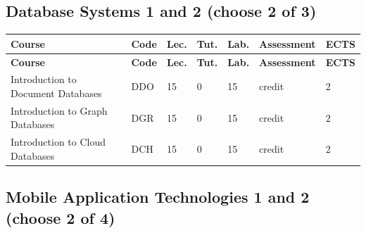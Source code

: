 \documentclass[12pt,a4paper]{article}
\newcommand{\thdrule}{\noalign{\global\setlength{\extrarowheight}{0pt}}}
\newcommand{\thdend}{\noalign{\global\setlength{\extrarowheight}{4pt}}}
\begin{document}
\subsection*{Database Systems 1 and 2 (choose 2 of 3)}

{\scriptsize
\begin{longtable}{m{5.5cm}m{0.8cm}m{1cm}m{1cm}m{1cm}m{1.7cm}m{0.7cm}}
\thdrule\toprule
\rowcolor{pjatkRed}
{\color{white}\footnotesize\textbf{\vphantom{Ag}Course}} & {\color{white}\footnotesize\textbf{\vphantom{Ag}Code}} & {\color{white}\footnotesize\textbf{\vphantom{Ag}Lec.}} & {\color{white}\footnotesize\textbf{\vphantom{Ag}Tut.}} & {\color{white}\footnotesize\textbf{\vphantom{Ag}Lab.}} & {\color{white}\footnotesize\textbf{\vphantom{Ag}Assessment}} & {\color{white}\footnotesize\textbf{\vphantom{Ag}ECTS}} \\
\midrule\thdend
\endfirsthead
\thdrule\toprule
\rowcolor{pjatkRed}
{\color{white}\footnotesize\textbf{\vphantom{Ag}Course}} & {\color{white}\footnotesize\textbf{\vphantom{Ag}Code}} & {\color{white}\footnotesize\textbf{\vphantom{Ag}Lec.}} & {\color{white}\footnotesize\textbf{\vphantom{Ag}Tut.}} & {\color{white}\footnotesize\textbf{\vphantom{Ag}Lab.}} & {\color{white}\footnotesize\textbf{\vphantom{Ag}Assessment}} & {\color{white}\footnotesize\textbf{\vphantom{Ag}ECTS}} \\
\midrule\thdend
\endhead
\rowcolor{tableRowLight} Introduction to Document Databases & DDO & 15 & 0 & 15 & {\scriptsize credit} & 2 \\
\rowcolor{tableRowAlt} Introduction to Graph Databases & DGR & 15 & 0 & 15 & {\scriptsize credit} & 2 \\
\rowcolor{tableRowLight} Introduction to Cloud Databases & DCH & 15 & 0 & 15 & {\scriptsize credit} & 2 \\
\bottomrule
\end{longtable}}

\subsection*{Mobile Application Technologies 1 and 2 (choose 2 of 4)}
\end{document}
